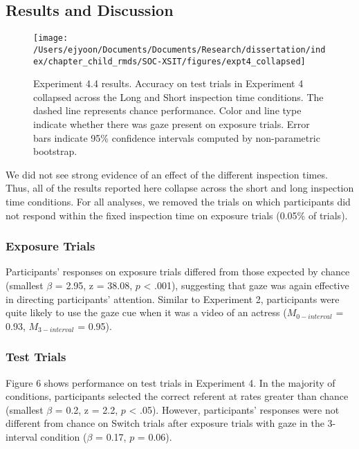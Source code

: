 \documentclass[oneside]{report}
\begin{document}
\subsection{Results and Discussion}\label{results-and-discussion-3}
\begin{figure}[!t]

{\centering \texttt{[image: /Users/ejyoon/Documents/Documents/Research/dissertation/index/chapter\_child\_rmds/SOC-XSIT/figures/expt4\_collapsed]} 

}

\caption[Experiment 4.4 results]{Experiment 4.4 results. Accuracy on test trials in Experiment 4 collapsed across the Long and Short inspection time conditions. The dashed line represents chance performance. Color and line type indicate whether there was gaze present on exposure trials. Error bars indicate 95\% confidence intervals computed by non-parametric bootstrap.}\label{fig:expt4-plot}
\end{figure}
We did not see strong evidence of an effect of the different inspection
times. Thus, all of the results reported here collapse across the short
and long inspection time conditions. For all analyses, we removed the
trials on which participants did not respond within the fixed inspection
time on exposure trials (0.05\% of trials).

\subsubsection{Exposure Trials}\label{exposure-trials-3}

Participants' responses on exposure trials differed from those expected
by chance (smallest \(\beta\) = 2.95, z = 38.08, \(p\) \textless{}
.001), suggesting that gaze was again effective in directing
participants' attention. Similar to Experiment 2, participants were
quite likely to use the gaze cue when it was a video of an actress
(\(M_{0-interval}\) = 0.93, \(M_{3-interval}\) = 0.95).

\subsubsection{Test Trials}\label{test-trials-3}

Figure 6 shows performance on test trials in Experiment 4. In the
majority of conditions, participants selected the correct referent at
rates greater than chance (smallest \(\beta\) = 0.2, z = 2.2, \(p\)
\textless{} .05). However, participants' responses were not different
from chance on Switch trials after exposure trials with gaze in the
3-interval condition (\(\beta\) = 0.17, \(p\) = 0.06).
\end{document}
